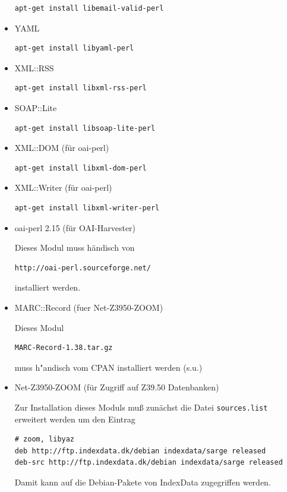 \documentclass[11pt, twoside, a4paper, BCOR8mm, DIV12, bibtotoc,idxtotoc]{scrbook}
\begin{document}
\begin{itemize}
\begin{verbatim}
apt-get install libemail-valid-perl
\end{verbatim}
\item YAML
\begin{verbatim}
apt-get install libyaml-perl
\end{verbatim}
\item XML::RSS
\begin{verbatim}
apt-get install libxml-rss-perl
\end{verbatim}
\item SOAP::Lite
\begin{verbatim}
apt-get install libsoap-lite-perl
\end{verbatim}
\item XML::DOM (für oai-perl)
\begin{verbatim}
apt-get install libxml-dom-perl
\end{verbatim}
\item XML::Writer (für oai-perl)
\begin{verbatim}
apt-get install libxml-writer-perl
\end{verbatim}
\item oai-perl 2.15 (für OAI-Harvester)

Dieses Modul muss händisch von
\begin{verbatim}
http://oai-perl.sourceforge.net/
\end{verbatim}
installiert werden.


\item MARC::Record (fuer Net-Z3950-ZOOM)

Dieses Modul 

\begin{verbatim}
MARC-Record-1.38.tar.gz
\end{verbatim}

muss h"andisch vom CPAN installiert werden (s.u.)


\item Net-Z3950-ZOOM (für Zugriff auf Z39.50 Datenbanken) 

Zur Installation dieses Moduls muß zunächst die Datei
  \texttt{sources.list} erweitert werden um den Eintrag
\begin{verbatim}
# zoom, libyaz
deb http://ftp.indexdata.dk/debian indexdata/sarge released
deb-src http://ftp.indexdata.dk/debian indexdata/sarge released
\end{verbatim}

Damit kann auf die Debian-Pakete von IndexData zugegriffen werden.


\end{itemize}
\end{document}
